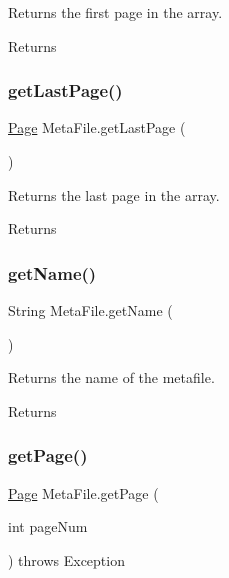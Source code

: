 Returns the first page in the array. \begin{DoxyReturn}{Returns}

\end{DoxyReturn}
\mbox{\label{class_meta_file_adf3ad8347572a056d3a7ae730c120303}} 
\subsubsection{\texorpdfstring{get\+Last\+Page()}{getLastPage()}}
{\footnotesize\ttfamily \mbox{\hyperlink{class_page}{Page}} Meta\+File.\+get\+Last\+Page (\begin{DoxyParamCaption}{ }\end{DoxyParamCaption})\hspace{0.3cm}{\ttfamily [inline]}}

Returns the last page in the array. \begin{DoxyReturn}{Returns}

\end{DoxyReturn}
\mbox{\label{class_meta_file_a7704cca7da5d2e765d70d01562d6f4da}} 
\subsubsection{\texorpdfstring{get\+Name()}{getName()}}
{\footnotesize\ttfamily String Meta\+File.\+get\+Name (\begin{DoxyParamCaption}{ }\end{DoxyParamCaption})\hspace{0.3cm}{\ttfamily [inline]}}

Returns the name of the metafile. \begin{DoxyReturn}{Returns}

\end{DoxyReturn}
\mbox{\label{class_meta_file_a28c7cbf3f8889b484df5b11b99825a4e}} 
\subsubsection{\texorpdfstring{get\+Page()}{getPage()}}
{\footnotesize\ttfamily \mbox{\hyperlink{class_page}{Page}} Meta\+File.\+get\+Page (\begin{DoxyParamCaption}\item[{int}]{page\+Num }\end{DoxyParamCaption}) throws Exception\hspace{0.3cm}{\ttfamily [inline]}}

